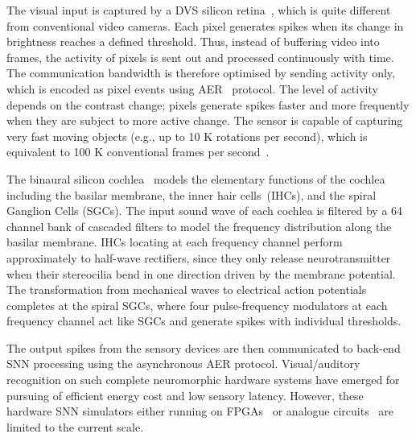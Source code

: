 The visual input is captured by a DVS silicon retina~\cite{serrano2013128, delbruck2008frame}, which is quite different from conventional video cameras.
Each pixel generates spikes when its change in brightness reaches a defined threshold.
Thus, instead of buffering video into frames, the activity of pixels is sent out and processed continuously with time.
The communication bandwidth is therefore optimised by sending activity only, which is encoded as pixel events using AER~\cite{lazzaro1995multi} protocol.
The level of activity depends on the contrast change; pixels generate spikes faster and more frequently when they are subject to more active change.
The sensor is capable of capturing very fast moving objects (e.g., up to 10 K rotations per second), which is equivalent to 100 K conventional frames per second~\cite{lenero20113}.

The binaural silicon cochlea~\cite{5537164} models the elementary functions of the cochlea including the basilar membrane, the inner hair cells~(IHCs), and the spiral Ganglion Cells (SGCs).
The input sound wave of each cochlea is filtered by a 64 channel bank of cascaded filters to model the frequency distribution along the basilar membrane.
IHCs locating at each frequency channel perform approximately to half-wave rectifiers, since they only release neurotransmitter when their stereocilia bend   in one direction driven by the membrane potential.
The transformation from mechanical waves to electrical action potentials completes at the spiral SGCs, where four pulse-frequency modulators at each frequency channel act like SGCs and generate spikes with individual thresholds.


The output spikes from the sensory devices are then communicated to back-end SNN processing using the asynchronous AER protocol.
Visual/auditory recognition on such complete neuromorphic hardware systems have emerged for pursuing of efficient energy cost and low sensory latency.
However, these hardware SNN simulators either running on FPGAs~\cite{neil2014minitaur, kiselev2016event} or analogue circuits~\cite{qiao2015reconfigurable} are limited to the current scale.

